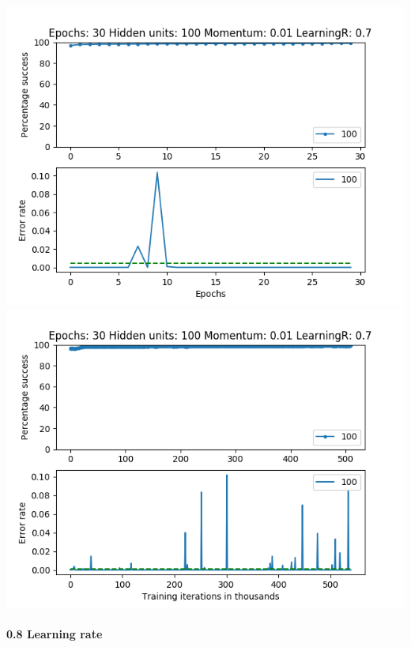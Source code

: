 \documentclass[11pt]{article}
\makeatletter
\def\maxwidth{\ifdim\Gin@nat@width>\linewidth\linewidth
    \else\Gin@nat@width\fi}
\let\Oldincludegraphics\includegraphics
\renewcommand{\includegraphics}[1]{\Oldincludegraphics[width=.8\maxwidth]{#1}}
\makeatother
\begin{document}
\includegraphics{Experiment1/E1_NN_Epoch_Momentum_0.01_30Epochs_100_LR_0.7_Hiddenunits.png}
\includegraphics{Experiment1/E1_NN_Training_Momentum_0.01_30Epochs_100_LR_0.7_Hiddenunits.png}

\hypertarget{learning-rate-7}{%
\paragraph{0.8 Learning rate}\label{learning-rate-7}}
\end{document}
